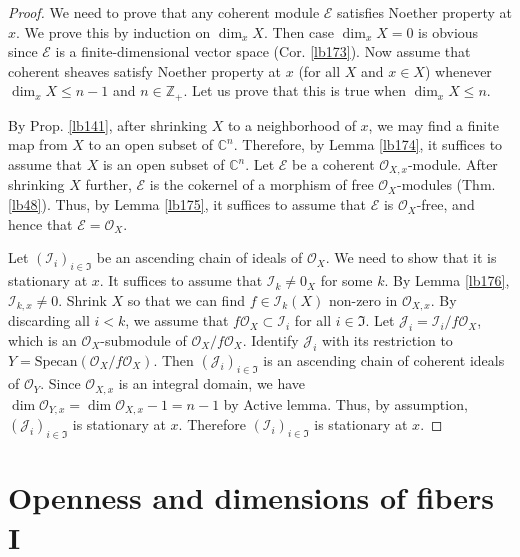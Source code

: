 \documentclass[12pt,b5paper,notitlepage]{report}
\theoremstyle{definition}
\theoremstyle{plain}
\newcommand{\fk}{\mathfrak}
\newcommand{\mc}{\mathcal}
\newcommand{\scr}{\mathscr}
\newcommand{\Cbb}{\mathbb C}
\newcommand{\Zbb}{\mathbb Z}
\newcommand{\Specan}{\mathrm{Specan}}
\numberwithin{equation}{section}
\begin{document}
\begin{proof}
We need to prove that any coherent module $\scr E$ satisfies Noether property at $x$. We prove this by induction on $\dim_xX$. Then case $\dim_xX=0$ is obvious since $\scr E$ is a finite-dimensional vector space (Cor. \ref{lb173}). Now assume that coherent sheaves satisfy Noether property at $x$ (for all $X$ and $x\in X$) whenever $\dim_xX\leq n-1$ and $n\in\Zbb_+$. Let us prove that this is true when $\dim_xX\leq n$.

By Prop. \ref{lb141}, after shrinking $X$ to a neighborhood of $x$, we may find a finite map from $X$ to an open subset of $\Cbb^n$. Therefore, by Lemma \ref{lb174}, it suffices to assume that $X$ is an open subset of $\Cbb^n$. Let $\scr E$ be a coherent $\scr O_{X,x}$-module. After shrinking $X$ further, $\scr E$ is the cokernel of a morphism of free $\scr O_X$-modules (Thm. \ref{lb48}). Thus, by Lemma \ref{lb175}, it suffices to assume that $\scr E$ is $\scr O_X$-free, and hence that $\scr E=\scr O_X$.

Let $(\mc I_i)_{i\in\fk I}$ be an ascending chain of ideals of $\scr O_X$. We need to show that it is stationary at $x$. It suffices to assume that $\mc I_k\neq 0_X$ for some $k$. By Lemma \ref{lb176}, $\mc I_{k,x}\neq 0$. Shrink $X$ so that we can find $f\in\mc I_k(X)$ non-zero in $\scr O_{X,x}$. By discarding all $i<k$, we assume that $f\scr O_X\subset\mc I_i$ for all $i\in\fk I$. Let $\mc J_i=\mc I_i/f\scr O_X$, which is an $\scr O_X$-submodule of $\scr O_X/f\scr O_X$. Identify $\mc J_i$ with its restriction to $Y=\Specan(\scr O_X/f\scr O_X)$. Then $(\mc J_i)_{i\in\fk I}$ is an ascending chain of coherent ideals of $\scr O_Y$. Since $\scr O_{X,x}$ is an integral domain, we have $\dim \scr O_{Y,x}=\dim\scr O_{X,x}-1=n-1$ by Active lemma. Thus, by assumption, $(\mc J_i)_{i\in\fk I}$ is stationary at $x$. Therefore $(\mc I_i)_{i\in\fk I}$ is stationary at $x$.
\end{proof}




















\section{Openness and dimensions of fibers I}\label{lb283}
\end{document}

